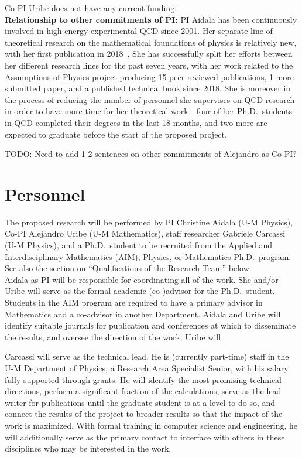 Co-PI Uribe does not have any current funding. \\


\noindent
\textbf{Relationship to other commitments of PI:} PI Aidala has been continuously involved in high-energy experimental QCD since 2001.  Her separate line of theoretical research on the mathematical foundations of physics is relatively new, with her first publication in 2018~\cite{aop-phys-blueprint}. She has successfully split her efforts between her different research lines for the past seven years, with her work related to the Assumptions of Physics project producing 15 peer-reviewed publications, 1 more submitted paper, and a published technical book since 2018.  She is moreover in the process of reducing the number of personnel she supervises on QCD research in order to have more time for her theoretical work---four of her Ph.D.~students in QCD completed their degrees in the last 18 months, and two more are expected to graduate before the start of the proposed project.  


TODO: Need to add 1-2 sentences on other commitments of Alejandro as Co-PI?




\section{Personnel}
The proposed research will be performed by PI Christine Aidala (U-M Physics), Co-PI Alejandro Uribe (U-M Mathematics), staff researcher Gabriele Carcassi (U-M Physics), and a Ph.D.~student to be recruited from the Applied and Interdisciplinary Mathematics (AIM), Physics, or Mathematics Ph.D.~program.  See also the section on ``Qualifications of the Research Team'' below.  \\

Aidala as PI will be responsible for coordinating all of the work.  She and/or Uribe will serve as the formal academic (co-)advisor for the Ph.D.~student.  Students in the AIM program are required to have a primary advisor in Mathematics and a co-advisor in another Department.  Aidala and Uribe will identify suitable journals for publication and conferences at which to disseminate the results, and oversee the direction of the work.  Uribe will 

Carcassi will serve as the technical lead.  He is (currently part-time) staff in the U-M Department of Physics, a Research Area Specialist Senior, with his salary fully supported through grants.  He will identify the most promising technical directions, perform a significant fraction of the calculations, serve as the lead writer for publications until the graduate student is at a level to do so, and connect the results of the project to broader results so that the impact of the work is maximized.  With formal training in computer science and engineering, he will additionally serve as the primary contact to interface with others in these disciplines who may be interested in the work.

